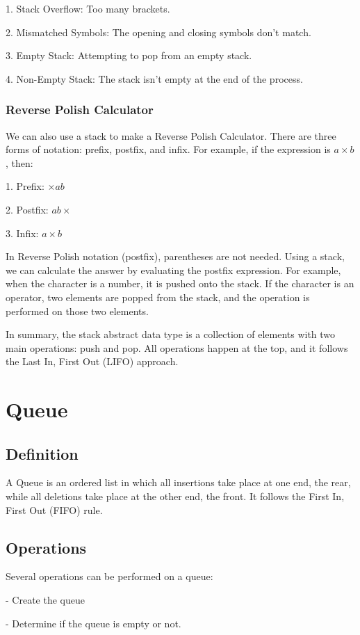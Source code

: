 1. Stack Overflow: Too many brackets.

2. Mismatched Symbols: The opening and closing symbols don't match.

3. Empty Stack: Attempting to pop from an empty stack.

4. Non-Empty Stack: The stack isn't empty at the end of the process.

\subsubsection{Reverse Polish Calculator}
We can also use a stack to make a Reverse Polish Calculator. There are three forms of notation: prefix, postfix, and infix. For example, if the expression is \(a \times b\), then:

1. Prefix: \(\times a b\)

2. Postfix: \(a b \times\)

3. Infix: \(a \times b\)

In Reverse Polish notation (postfix), parentheses are not needed. Using a stack, we can calculate the answer by evaluating the postfix expression. For example, when the character is a number, it is pushed onto the stack. If the character is an operator, two elements are popped from the stack, and the operation is performed on those two elements.

In summary, the stack abstract data type is a collection of elements with two main operations: push and pop. All operations happen at the top, and it follows the Last In, First Out (LIFO) approach.

\section{Queue}
\subsection{Definition}
A Queue is an ordered list in which all insertions take place at one end, the rear, while all deletions take place at the other end, the front. It follows the First In, First Out (FIFO) rule.

\subsection{Operations}
Several operations can be performed on a queue:

- Create the queue

- Determine if the queue is empty or not.

